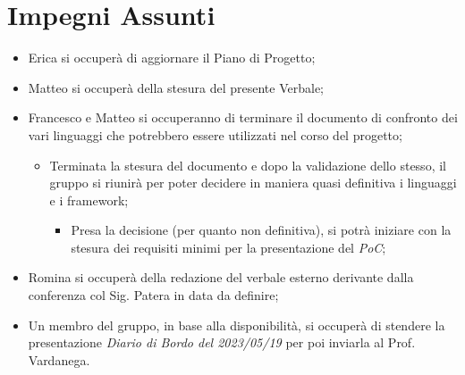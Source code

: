 \documentclass[a4paper, 12pt]{article}
\begin{document}
\section*{Impegni Assunti}
\begin{itemize}
    \item Erica si occuperà di aggiornare il Piano di Progetto;
    \item Matteo si occuperà della stesura del presente Verbale;
    \item Francesco e Matteo si occuperanno di terminare il documento di confronto dei vari linguaggi che potrebbero essere utilizzati nel corso del progetto;
    \begin{itemize}
        \item Terminata la stesura del documento e dopo la validazione dello stesso, il gruppo si riunirà per poter decidere in maniera quasi definitiva i linguaggi e i framework;
        \begin{itemize}
            \item Presa la decisione (per quanto non definitiva), si potrà iniziare con la stesura dei requisiti minimi per la presentazione del \textit{PoC};
        \end{itemize}
    \end{itemize} 
    \item Romina si occuperà della redazione del verbale esterno derivante dalla conferenza col Sig. Patera in data da definire;
    \item Un membro del gruppo, in base alla disponibilità, si occuperà di stendere la presentazione \textit{Diario di Bordo del 2023/05/19} per poi inviarla al Prof. Vardanega.
\end{itemize}
\end{document}
